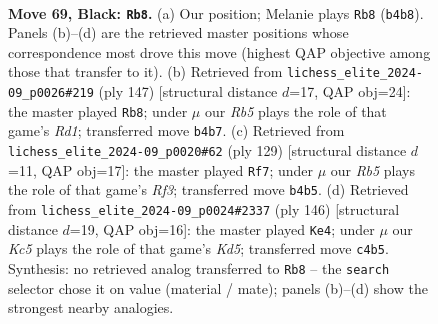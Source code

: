 \documentclass[11pt]{article}
\begin{document}
\clearpage

\begin{figure}[p]\centering
\begin{subfigure}{0.46\textwidth}\centering
\resizebox{\linewidth}{!}{%
\newchessgame
\chessboard[
  setfen={8/6P1/3Q4/4P2P/1rk5/8/2K5/8 b - - 0 69},
  showmover=false,
  pgfstyle=straightmove, color=movearrow, markmove={b4-b8}
]}
\caption{}
\end{subfigure}\hfill
\begin{subfigure}{0.46\textwidth}\centering
\resizebox{\linewidth}{!}{%
\newchessgame
\chessboard[
  setfen={3r4/3k4/5Q2/5K2/8/6P1/8/8 b - - 0 74},
  showmover=false,
  pgfstyle=straightmove, color=movearrow, markmove={d8-b8}
]}
\caption{}
\end{subfigure}
\\[4pt]
\begin{subfigure}{0.46\textwidth}\centering
\resizebox{\linewidth}{!}{%
\newchessgame
\chessboard[
  setfen={8/6QP/4kr2/8/8/8/4K3/8 b - - 6 65},
  showmover=false,
  pgfstyle=straightmove, color=movearrow, markmove={f6-f7}
]}
\caption{}
\end{subfigure}\hfill
\begin{subfigure}{0.46\textwidth}\centering
\resizebox{\linewidth}{!}{%
\newchessgame
\chessboard[
  setfen={8/8/8/3K4/pq1R4/8/1k6/8 w - - 0 74},
  showmover=false,
  pgfstyle=straightmove, color=movearrow, markmove={d5-e4}
]}
\caption{}
\end{subfigure}
\caption{\textbf{Move 69, Black: \texttt{Rb8}.} (a) Our position; Melanie plays \texttt{Rb8} (\texttt{b4b8}). Panels (b)--(d) are the retrieved master positions whose correspondence most drove this move (highest QAP objective among those that transfer to it). (b) Retrieved from \texttt{lichess\_elite\_2024-09\_p0026\#219} (ply 147) [structural distance $d$=17, QAP obj=24]: the master played \texttt{Rb8}; under $\mu$ our \emph{Rb5} plays the role of that game's \emph{Rd1}; transferred move \texttt{b4b7}. (c) Retrieved from \texttt{lichess\_elite\_2024-09\_p0020\#62} (ply 129) [structural distance $d$=11, QAP obj=17]: the master played \texttt{Rf7}; under $\mu$ our \emph{Rb5} plays the role of that game's \emph{Rf3}; transferred move \texttt{b4b5}. (d) Retrieved from \texttt{lichess\_elite\_2024-09\_p0024\#2337} (ply 146) [structural distance $d$=19, QAP obj=16]: the master played \texttt{Ke4}; under $\mu$ our \emph{Kc5} plays the role of that game's \emph{Kd5}; transferred move \texttt{c4b5}. Synthesis: no retrieved analog transferred to \texttt{Rb8} -- the \texttt{search} selector chose it on value (material / mate); panels (b)--(d) show the strongest nearby analogies.}
\label{fig:thought-m137}
\end{figure}
\end{document}
